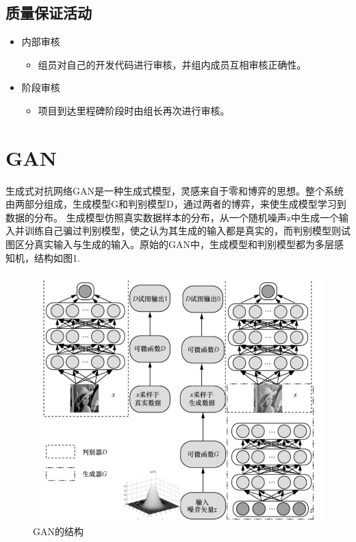 \documentclass[
  hyperref, a4paper]{ctexart}
\providecommand{\tightlist}{%
  \setlength{\itemsep}{0pt}\setlength{\parskip}{0pt}}
\begin{document}
\hypertarget{ux8d28ux91cfux4fddux8bc1ux6d3bux52a8}{%
\subsection{质量保证活动}\label{ux8d28ux91cfux4fddux8bc1ux6d3bux52a8}}

\begin{itemize}
\tightlist
\item
  内部审核

  \begin{itemize}
  \tightlist
  \item
    组员对自己的开发代码进行审核，并组内成员互相审核正确性。
  \end{itemize}
\item
  阶段审核

  \begin{itemize}
  \tightlist
  \item
    项目到达里程碑阶段时由组长再次进行审核。
  \end{itemize}
\end{itemize}

\hypertarget{gan}{%
\section{GAN}\label{gan}}

生成式对抗网络GAN是一种生成式模型，灵感来自于零和博弈的思想。整个系统由两部分组成，生成模型G和判别模型D，通过两者的博弈，来使生成模型学习到数据的分布。
生成模型仿照真实数据样本的分布，从一个随机噪声z中生成一个输入并训练自己骗过判别模型，使之认为其生成的输入都是真实的，而判别模型则试图区分真实输入与生成的输入。原始的GAN中，生成模型和判别模型都为多层感知机，结构如图1.

\begin{figure}
\centering
\includegraphics{1.png}
\caption{GAN的结构}
\end{figure}
\end{document}
